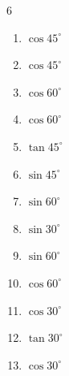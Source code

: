 \begin{multicols}{6}
\begin{enumerate}
  \item $\displaystyle \cos{45^\circ}$


  \item $\displaystyle \cos{45^\circ}$


  \item $\displaystyle \cos{60^\circ}$


  \item $\displaystyle \cos{60^\circ}$


  \item $\displaystyle \tan{45^\circ}$

        \phantom{$\displaystyle =1$}

  \item $\displaystyle \sin{45^\circ}$


  \item $\displaystyle \sin{60^\circ}$


  \item $\displaystyle \sin{30^\circ}$


  \item $\displaystyle \sin{60^\circ}$


\columnbreak %

  \item $\displaystyle \cos{60^\circ}$


  \item $\displaystyle \cos{30^\circ}$


  \item $\displaystyle \tan{30^\circ}$


  \item $\displaystyle \cos{30^\circ}$


\end{enumerate}
\end{multicols}
